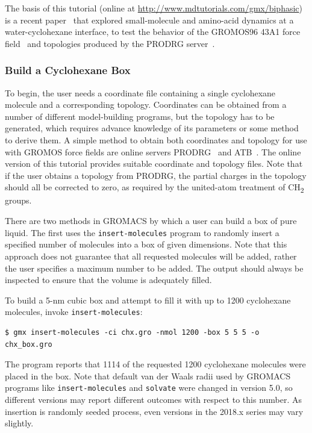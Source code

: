\documentclass[9pt,tutorial,pubversion]{livecoms}
\newcommand{\urlstring}{http://www.mdtutorials.com/gmx}
\newcommand{\tutorialbiphasic}{\url{\urlstring/biphasic}}
\begin{document}
The basis of this tutorial (online at \tutorialbiphasic) is a recent paper~\cite{Lemkul2010b} that explored small-molecule and amino-acid dynamics at a water-cyclohexane interface, to test the behavior of the GROMOS96 43A1 force field~\cite{Daura1998,Schuler2001} and topologies produced by the PRODRG server~\cite{vanAalten1996}.

\subsubsection{Build a Cyclohexane Box} \label{biphasic_chx_box}

To begin, the user needs a coordinate file containing a single cyclohexane molecule and a corresponding topology. Coordinates can be obtained from a number of different model-building programs, but the topology has to be generated, which requires advance knowledge of its parameters or some method to derive them. A simple method to obtain both coordinates and topology for use with GROMOS force fields are online servers PRODRG~\cite{vanAalten1996} and ATB~\cite{Malde2011}. The online version of this tutorial provides suitable coordinate and topology files. Note that if the user obtains a topology from PRODRG, the partial charges in the topology should all be corrected to zero, as required by the united-atom treatment of CH\textsubscript{2} groups.

There are two methods in GROMACS by which a user can build a box of pure liquid. The first uses the \texttt{insert-molecules} program to randomly insert a specified number of molecules into a box of given dimensions. Note that this approach does not guarantee that all requested molecules will be added, rather the user specifies a maximum number to be added. The output should always be inspected to ensure that the volume is adequately filled.

To build a 5-nm cubic box and attempt to fill it with up to 1200 cyclohexane molecules, invoke \texttt{insert-molecules}:

\begin{lstlisting}
$ gmx insert-molecules -ci chx.gro -nmol 1200 -box 5 5 5 -o chx_box.gro
\end{lstlisting}
%
The program reports that 1114 of the requested 1200 cyclohexane molecules were placed in the box. Note that default van der Waals radii used by GROMACS programs like \texttt{insert-molecules} and \texttt{solvate} were changed in version 5.0, so different versions may report different outcomes with respect to this number. As insertion is randomly seeded process, even versions in the 2018.x series may vary slightly.
\end{document}
